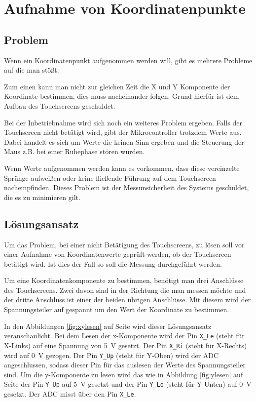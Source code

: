 \chapter{Aufnahme von Koordinatenpunkte}
\section{Problem}
Wenn ein Koordinatenpunkt aufgenommen werden will, gibt es mehrere Probleme auf die man stößt. 

Zum einen kann man nicht zur gleichen Zeit die X und Y Komponente der Koordinate bestimmen, dies muss nacheinander folgen. 
Grund hierfür ist dem Aufbau des Touchscreens geschuldet.

Bei der Inbetriebnahme wird sich noch ein weiteres Problem ergeben. Falls der Touchscreen nicht betätigt wird, gibt der Mikrocontroller trotzdem Werte aus. 
Dabei handelt es sich um Werte die keinen Sinn ergeben und die Steuerung der Maus z.B. bei einer Ruhephase stören würden.

Wenn Werte aufgenommen werden kann es vorkommen, dass diese vereinzelte Sprünge aufweißen oder keine fließende Führung auf dem Touchscreen nachempfinden.
Dieses Problem ist der Messunsicherheit des Systems geschuldet, die es zu  minimieren gilt.

\section{Lösungsansatz}
Um das Problem, bei einer nicht Betätigung des Touchscreens, zu lösen soll vor einer Aufnahme von Koordinatenwerte geprüft werden, ob der Touchscreen betätigt wird. 
Ist dies der Fall so soll die Messung durchgeführt werden.

Um eine Koordinatenkomponente zu bestimmen, benötigt man drei Anschlüsse des Touchscreens. Zwei davon sind in der Richtung die man messen möchte und der dritte Anschluss ist einer der beiden übrigen Anschlüsse. 
Mit diesem wird der Spannungsteiler auf gespannt um den Wert der Koordinate zu bestimmen.

In den Abbildungen \ref{fig:xylesen} auf Seite \pageref{fig:xylesen} wird dieser Lösungsansatz veranschaulicht. 
Bei dem Lesen der x-Komponente  wird der Pin \verb$X_Le$ (steht für X-Links) auf eine Spannung von \SI{5}{V} gesetzt. Der Pin \verb$X_Ri$ (steht für X-Rechts) wird auf \SI{0}{V} gezogen.
Der Pin  \verb$Y_Up$ (steht für Y-Oben) wird der ADC angeschlussen, sodass dieser Pin für das auslesen der Werte des Spannungsteiler sind. 
Um die y-Komponente zu lesen wird das wie in Abbildung \ref{fig:ylesen} auf Seite \pageref{fig:ylesen} der Pin \verb$Y_Up$ auf \SI{5}{V} gesetzt und der Pin \verb$Y_Lo$ (steht für Y-Unten) auf \SI{0}{V} gesetzt. Der ADC misst über den Pin \verb$X_Le$.

